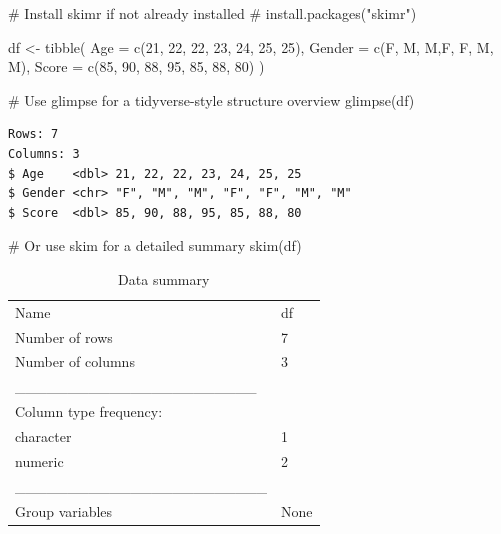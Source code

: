 \documentclass[
  man,
  floatsintext,
  longtable,
  nolmodern,
  notxfonts,
  notimes,
  colorlinks=true,linkcolor=blue,citecolor=blue,urlcolor=blue]{apa7}
\newenvironment{Shaded}{\begin{snugshade}}{\end{snugshade}}
\newcommand{\AttributeTok}[1]{\textcolor[rgb]{0.40,0.45,0.13}{#1}}
\newcommand{\CommentTok}[1]{\textcolor[rgb]{0.37,0.37,0.37}{#1}}
\newcommand{\DecValTok}[1]{\textcolor[rgb]{0.68,0.00,0.00}{#1}}
\newcommand{\FunctionTok}[1]{\textcolor[rgb]{0.28,0.35,0.67}{#1}}
\newcommand{\NormalTok}[1]{\textcolor[rgb]{0.00,0.23,0.31}{#1}}
\newcommand{\OtherTok}[1]{\textcolor[rgb]{0.00,0.23,0.31}{#1}}
\newcommand{\StringTok}[1]{\textcolor[rgb]{0.13,0.47,0.30}{#1}}
\begin{document}
\begin{Shaded}
\begin{Highlighting}[]
\CommentTok{\# Install skimr if not already installed}
\CommentTok{\# install.packages("skimr")}

\NormalTok{df }\OtherTok{\textless{}{-}} \FunctionTok{tibble}\NormalTok{(}
  \AttributeTok{Age =} \FunctionTok{c}\NormalTok{(}\DecValTok{21}\NormalTok{, }\DecValTok{22}\NormalTok{, }\DecValTok{22}\NormalTok{, }\DecValTok{23}\NormalTok{, }\DecValTok{24}\NormalTok{, }\DecValTok{25}\NormalTok{, }\DecValTok{25}\NormalTok{),}
  \AttributeTok{Gender =} \FunctionTok{c}\NormalTok{(}\StringTok{\textquotesingle{}F\textquotesingle{}}\NormalTok{, }\StringTok{\textquotesingle{}M\textquotesingle{}}\NormalTok{, }\StringTok{\textquotesingle{}M\textquotesingle{}}\NormalTok{,}\StringTok{\textquotesingle{}F\textquotesingle{}}\NormalTok{, }\StringTok{\textquotesingle{}F\textquotesingle{}}\NormalTok{, }\StringTok{\textquotesingle{}M\textquotesingle{}}\NormalTok{, }\StringTok{\textquotesingle{}M\textquotesingle{}}\NormalTok{),}
  \AttributeTok{Score =} \FunctionTok{c}\NormalTok{(}\DecValTok{85}\NormalTok{, }\DecValTok{90}\NormalTok{, }\DecValTok{88}\NormalTok{, }\DecValTok{95}\NormalTok{, }\DecValTok{85}\NormalTok{, }\DecValTok{88}\NormalTok{, }\DecValTok{80}\NormalTok{)}
\NormalTok{)}

\CommentTok{\# Use glimpse for a tidyverse{-}style structure overview}
\FunctionTok{glimpse}\NormalTok{(df)}
\end{Highlighting}
\end{Shaded}

\begin{verbatim}
Rows: 7
Columns: 3
$ Age    <dbl> 21, 22, 22, 23, 24, 25, 25
$ Gender <chr> "F", "M", "M", "F", "F", "M", "M"
$ Score  <dbl> 85, 90, 88, 95, 85, 88, 80
\end{verbatim}

\begin{Shaded}
\begin{Highlighting}[]
\CommentTok{\# Or use skim for a detailed summary}
\FunctionTok{skim}\NormalTok{(df)}
\end{Highlighting}
\end{Shaded}

\begin{longtable}[]{@{}ll@{}}
\caption{Data summary}\tabularnewline
\toprule\noalign{}
\endfirsthead
\endhead
\bottomrule\noalign{}
\endlastfoot
Name & df \\
Number of rows & 7 \\
Number of columns & 3 \\
\_\_\_\_\_\_\_\_\_\_\_\_\_\_\_\_\_\_\_\_\_\_\_ & \\
Column type frequency: & \\
character & 1 \\
numeric & 2 \\
\_\_\_\_\_\_\_\_\_\_\_\_\_\_\_\_\_\_\_\_\_\_\_\_ & \\
Group variables & None \\
\end{longtable}
\end{document}
